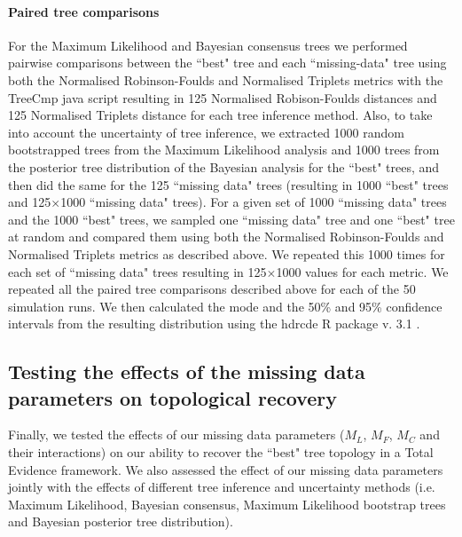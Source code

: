 \documentclass[10pt,letterpaper]{article}
\begin{document}
\paragraph*{Paired tree comparisons}
\label{tree_comparisons}
For the Maximum Likelihood and Bayesian consensus trees we performed pairwise comparisons between the ``best" tree and each ``missing-data" tree using both the Normalised Robinson-Foulds and Normalised Triplets metrics with the TreeCmp java script \cite{Bogdanowicz2012} resulting in 125 Normalised Robison-Foulds distances and 125 Normalised Triplets distance for each tree inference method. Also, to take into account the uncertainty of tree inference, we extracted 1000 random bootstrapped trees from the Maximum Likelihood analysis and 1000 trees from the posterior tree distribution of the Bayesian analysis for the ``best" trees, and then did the same for the 125 ``missing data" trees (resulting in 1000 ``best" trees and 125$\times$1000 ``missing data" trees). 
For a given set of 1000 ``missing data" trees and the 1000 ``best" trees, we sampled one ``missing data" tree and one ``best" tree at random and compared them using both the Normalised Robinson-Foulds and Normalised Triplets metrics as described above. We repeated this 1000 times for each set of ``missing data" trees resulting in 125$\times$1000 values for each metric. We repeated all the paired tree comparisons described above for each of the 50 simulation runs. We then calculated the mode and the 50\% and 95\% confidence intervals from the resulting distribution using the hdrcde R package v. 3.1 \cite{hdrcde}.

\subsection*{Testing the effects of the missing data parameters on topological recovery}
Finally, we tested the effects of our missing data parameters ($M_{L}$, $M_{F}$, $M_{C}$ and their interactions) on our ability to recover the ``best" tree topology in a Total Evidence framework. We also assessed the effect of our missing data parameters jointly with the effects of different tree inference and uncertainty methods (i.e. Maximum Likelihood, Bayesian consensus, Maximum Likelihood bootstrap trees and Bayesian posterior tree distribution).
\end{document}
